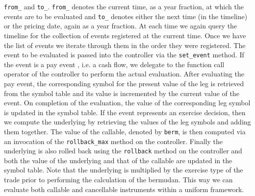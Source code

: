 \verb|from_| and \verb|to_|. \verb|from_| denotes the current time, as
a year fraction, at which the events are to be evaluated and
\verb|to_| denotes either the next time (in the timeline) or the
pricing date, again as a year fraction. At each time we again query
the timeline for the collection of events registered at the current
time. Once we have the list of events we iterate through them in the
order they were registered. The event to be evaluated is passed into
the controller via the \verb|set_event| method. If the event is a pay
event , i.e. a cash flow, we delegate to the function call operator of
the controller to perform the actual evaluation. After evaluating the
pay event, the corresponding symbol for the present value of the leg
is retrieved from the symbol table and its value is incremented by the
current value of the event. On completion of the evaluation, the value
of the corresponding leg symbol is updated in the symbol table. If the
event represents an exercise decision, then we compute the underlying
by retrieving the values of the leg symbols and adding them
together. The value of the callable, denoted by \verb|berm|, is then
computed via an invocation of the \verb|rollback_max| method on the
controller.  Finally the underlying is also rolled back using the
\verb|rollback| method on the controller and both the value of the
underlying and that of the callable are updated in the symbol
table. Note that the underlying is multiplied by the exercise type of
the trade prior to performing the calculation of the bermudan. This
way we can evaluate both callable and cancellable instruments within a
uniform framework.
